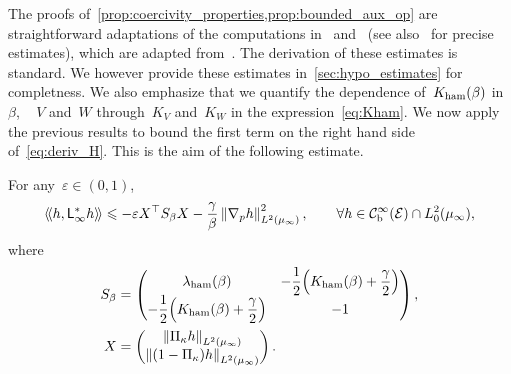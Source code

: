 \documentclass[onefignum,onetabnum]{siamart251216} %
\newcommand{\norm}[1]{\left\lVert#1\right\rVert}
\newcommand{\mc}[1]{\mathcal{#1}}
\renewcommand{\leq}{\leqslant}
\newcommand{\mescin}{\mu}
\newcommand{\projvit}{\Pi_{\kappa}}
\newcommand{\adj}{\mathsf{L}_\infty^*}
\newcommand{\dblangle}[1]{\left\langle\!\left\langle #1 \right\rangle\!\right\rangle}
\newcommand{\norml}[1]{\norm{#1}_{L^2(\mescin_\infty)}}
\newcommand{\eps}{\varepsilon}
\newcommand{\lambham}{\lambda_{\rm{ham}}(\beta)}
\newcommand{\kham}{K_{\rm{ham}}(\beta)}
\theoremstyle{plain}
\numberwithin{equation}{section}
\numberwithin{theorem}{section}
\begin{document}
    The proofs of~\cref{prop:coercivity_properties,prop:bounded_aux_op} are straightforward adaptations of the computations in~\cite[Section 5.3]{iacobucci2019convergence} and~\cite[Appendix A]{roussel2018spectral} (see also~\cite{bernard2022hypocoercivity} for precise estimates), which are adapted from~\cite{dolbeault2009hypocoercivity,dolbeault2015hypocoercivity}. The derivation of these estimates is standard. We however provide these estimates in~\cref{sec:hypo_estimates} for completness. We also emphasize that we quantify the dependence of~$\kham$ in~$\beta$, ~ $V$ and~$W$ through~$K_V$ and~$K_W$ in the expression~\eqref{eq:Kham}. We now apply the previous results to bound the first term on the right hand side of~\eqref{eq:deriv_H}. This is the aim of the following estimate.
\begin{proposition}
    \label{prop:hypo_gen_lin}
    For any~$\eps \in(0,1)$,
    \begin{align}
        \label{eq:bound_adj_lin}
        \dblangle{h,\adj h} \leq -\eps X^\top S_\beta X -\frac{\gamma}{\beta}\norml{\nabla_p h}^2,\qquad \forall h \in \mc{C}_{\rm b}^\infty(\mc{E})\cap L_0^2(\mescin_\infty),
    \end{align}
    where
    \begin{align}
        \label{eq:matrixS}
        S_\beta &= \begin{pmatrix}
            \displaystyle\lambham & \displaystyle-\frac{1}{2}\!\left(\kham + \frac{\gamma}{2}\right) \\
            \displaystyle-\frac{1}{2}\!\left(\kham + \frac{\gamma}{2}\right) & \displaystyle - 1
            \end{pmatrix}, \\
        X &= \begin{pmatrix}
                \norml{\projvit h} \\
                \norml{(1-\projvit)h}
            \end{pmatrix}.
    \end{align}
\end{proposition}
\end{document}
